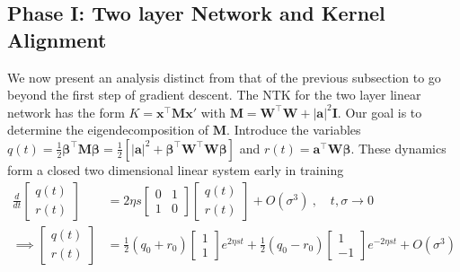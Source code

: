 \documentclass{article} %
\def\x{\bm x}
\begin{document}
\begin{appendix}

\subsection{Phase I: Two layer Network and Kernel Alignment}\label{app:two_layer_phase_one}\label{subsec:phase1}

We now present an analysis distinct from that of the previous subsection to go beyond the first step of gradient descent. The NTK for the two layer linear network has the form $K = \x^\top \bm M \x'$ with $\bm M = \bm W^\top \bm W + |\bm a|^2 \bm I$. Our goal is to determine the eigendecomposition of $\bm M$. Introduce the variables $q(t) = \frac{1}{2} \bm\beta^\top \bm M \bm\beta = \frac{1}{2} \left[ |\bm a|^2 + \bm\beta^\top \bm W^\top \bm W \bm\beta \right]$ and $r(t) = \bm a^\top \bm W \bm \beta $. These dynamics form a closed two dimensional linear system early in training
\begin{equation}
\begin{aligned}
   \frac{d}{dt} \begin{bmatrix}
    q(t) \\ r(t)
    \end{bmatrix} 
    &= 2 \eta s \begin{bmatrix}
        0 & 1 \\
        1 & 0 
        \end{bmatrix}\begin{bmatrix}
    q(t) \\ r(t)
    \end{bmatrix} + O(\sigma^3) \ , \quad   t,\sigma \to 0 
    \\  \implies \begin{bmatrix}
    q(t) \\ r(t)
    \end{bmatrix} &=
    \frac{1}{2}(q_0+r_0) \begin{bmatrix} 1  \\ 1 \end{bmatrix} e^{2 \eta st} + \frac{1}{2}(q_0-r_0) \begin{bmatrix} 1  \\ -1 \end{bmatrix} e^{-2 \eta s t} + O(\sigma^3)

\end{aligned}
\end{equation}
\end{appendix}
\end{document}
